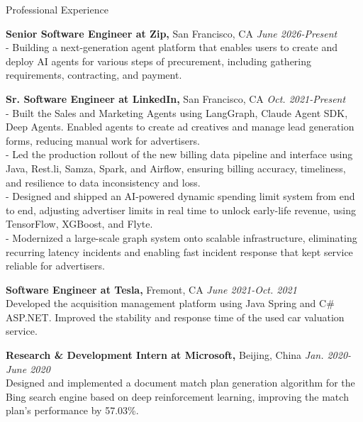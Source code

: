 \documentclass{resume}
\begin{document}
\begin{rSection}{Professional Experience}

{\bf Senior Software Engineer at Zip,} San Francisco, CA \hfill{\em June 2026-Present}
\\ - Building a next-generation agent platform that enables users to create and deploy AI agents for various steps of precurement, including gathering requirements, contracting, and payment.

{\bf Sr. Software Engineer at LinkedIn,} San Francisco, CA \hfill{\em Oct. 2021-Present}
\\ - Built the Sales and Marketing Agents using LangGraph, Claude Agent SDK, Deep Agents. Enabled agents to create ad creatives and manage lead generation forms, reducing manual work for advertisers.
\\ - Led the production rollout of the new billing data pipeline and interface using Java, Rest.li, Samza, Spark, and Airflow, ensuring billing accuracy, timeliness, and resilience to data inconsistency and loss.
\\ - Designed and shipped an AI-powered dynamic spending limit system from end to end, adjusting advertiser limits in real time to unlock early-life revenue, using TensorFlow, XGBoost, and Flyte.
\\ - Modernized a large-scale graph system onto scalable infrastructure, eliminating recurring latency incidents and enabling fast incident response that kept service reliable for advertisers.

{\bf Software Engineer at Tesla,} Fremont, CA \hfill{\em June 2021-Oct. 2021}\\Developed the acquisition management platform using Java Spring and C\# ASP.NET. Improved the stability and response time of the used car valuation service.

{\bf Research \& Development Intern at Microsoft,} Beijing, China \hfill{\em Jan. 2020-June 2020}
\\{Designed and implemented a document match plan generation algorithm for the Bing search engine based on deep reinforcement learning, improving the match plan's performance by 57.03\%.}


\end{rSection}
\end{document}
